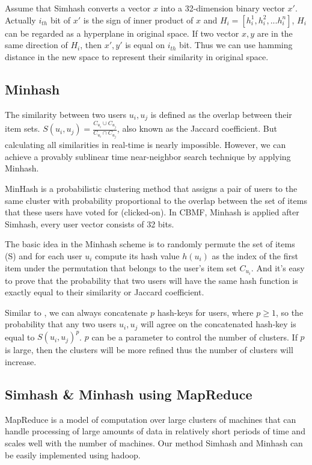 Assume that Simhash converts a vector $x$ into a 32-dimension binary vector $x'$. Actually $i_{th}$ bit of $x'$ is the sign of inner product of $x$ and $H_i = [h^1_i, h^2_i,...h^n_i]$, $H_i$ can be regarded as a hyperplane in original space. If two vector $x, y$ are in the same direction of $H_i$, then $x', y'$ is equal on $i_{th}$ bit. Thus we can use hamming distance in the new space to represent their similarity in original space.

\subsection{Minhash}

The similarity between two users $u_i , u_j$ is defined as the overlap between their item sets. $S(u_i, u_j) = \frac{C_{u_i} \cup C_{u_j}}{C_{u_i} \cap C_{u_j}}$, also known as the Jaccard coefficient. But calculating all similarities in real-time is nearly impossible. However, we can achieve a provably sublinear time near-neighbor search technique by applying Minhash.

MinHash is a probabilistic clustering method that assigns a pair of users to the same cluster with probability proportional to the overlap between the set of items that these users have voted for (clicked-on). In CBMF, Minhash is applied after Simhash, every user vector consists of 32 bits. 

The basic idea in the Minhash scheme is to randomly permute the set of items (S) and for each user $u_i$ compute its hash value $h(u_i)$ as the index of the first item under the permutation that belongs to the user’s item set $C_{u_i}$. And it's easy to prove that the probability that two users will have the same hash function is exactly equal to their similarity or Jaccard coefficient.

Similar to \cite{Indyk:1998:ANN:276698.276876}, we can always concatenate $p$ hash-keys for
users, where $p \ge 1$, so the probability that any two users $u_i , u_j$ will agree on the concatenated hash-key is equal to $S(u_i , u_j )^p$. $p$ can be a parameter to control the number of clusters. If $p$ is large, then the clusters will be more refined thus the number of clusters will increase.

\subsection{Simhash \& Minhash using MapReduce}

MapReduce is a model of computation over large clusters of machines that can handle processing of large amounts of data in relatively short periods of time and scales well with the number of machines. Our method Simhash and Minhash can be easily implemented using hadoop.

